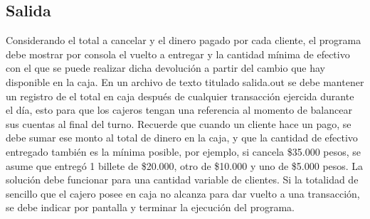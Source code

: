 \documentclass[9pt,twocolumn,twoside]{optica}
\begin{document}
\subsection{Salida}
Considerando el total a cancelar y el dinero pagado por cada cliente, el
programa debe mostrar por consola el vuelto a entregar y la cantidad mínima
de efectivo con el que se puede realizar dicha devolución a partir del cambio que
hay disponible en la caja. En un archivo de texto titulado
salida.out
se debe
mantener un registro de el total en caja después de cualquier transacción ejercida
durante el día, esto para que los cajeros tengan una referencia al momento de
balancear sus cuentas al final del turno. Recuerde que cuando un cliente hace un
pago, se debe sumar ese monto al total de dinero en la caja, y que la cantidad de
efectivo entregado también es la mínima posible, por ejemplo, si cancela \$35.000
pesos, se asume que entregó 1 billete de \$20.000, otro de \$10.000 y uno de \$5.000
pesos. La solución debe funcionar para una cantidad variable de clientes.
Si la totalidad de sencillo que el cajero posee en caja no alcanza para dar
vuelto a una transacción, se debe indicar por pantalla y terminar la ejecución
del programa.
\end{document}
